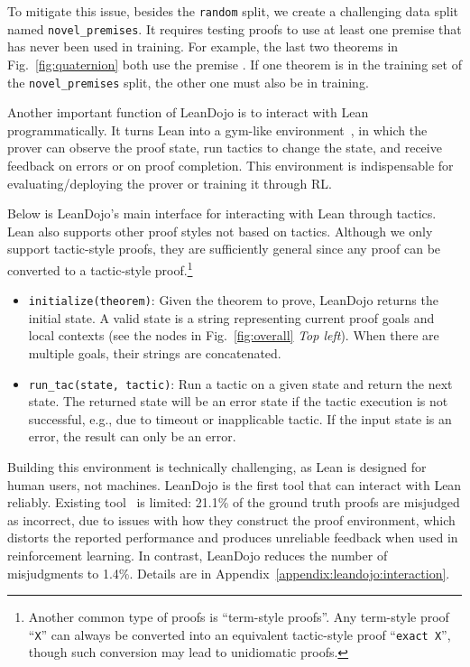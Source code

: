 To mitigate this issue, besides the \texttt{random} split, we create a challenging data split named \texttt{novel\_premises}. It requires testing proofs to use at least one premise that has never been used in training. For example, the last two theorems in Fig.~\ref{fig:quaternion} both use the premise . If one theorem is in the training set of the \texttt{novel\_premises} split, the other one must also be in training.


Another important function of LeanDojo is to interact with Lean programmatically. It turns Lean into a gym-like environment~\cite{brockman2016openai}, in which the prover can observe the proof state, run tactics to change the state, and receive feedback on errors or on proof completion. This environment is indispensable for evaluating/deploying the prover or training it through RL. 

Below is LeanDojo's main interface for interacting with Lean through tactics. Lean also supports other proof styles not based on tactics. Although we only support tactic-style proofs, they are sufficiently general since any proof can be converted to a tactic-style proof.\footnote{Another common type of proofs is ``term-style proofs''. Any term-style proof ``\texttt{X}'' can always be converted into an equivalent tactic-style proof ``\texttt{exact X}'', though such conversion may lead to unidiomatic proofs.}
\begin{itemize}[leftmargin=*]

\item \texttt{initialize(theorem)}: Given the theorem to prove, LeanDojo returns the initial state. A valid state is a string representing current proof goals and local contexts (see the nodes in Fig.~\ref{fig:overall} \emph{Top left}). When there are multiple goals, their strings are concatenated.

\item \texttt{run\_tac(state, tactic)}: Run a tactic on a given state and return the next state. The returned state will be an error state if the tactic execution is not successful, e.g., due to timeout or inapplicable tactic. If the input state is an error, the result can only be an error.

\end{itemize}

Building this environment is technically challenging, as Lean is designed for human users, not machines. LeanDojo is the first tool that can interact with Lean reliably. Existing tool~\cite{polu2023formal} is limited: 21.1\% of the ground truth proofs are misjudged as incorrect, due to issues with how they construct the proof environment, which distorts the reported performance and produces unreliable feedback when used in reinforcement learning. In contrast, LeanDojo reduces the number of misjudgments to 1.4\%. Details are in Appendix~\ref{appendix:leandojo:interaction}.

